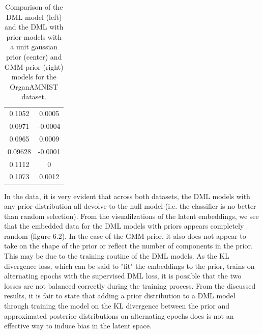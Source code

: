 \documentclass[./dissertation.tex]{subfiles}
\begin{document}
\begin{table}[]
\begin{tabular}{|c|c|}
            0.1052 & 0.0005 \\
            0.0971 & -0.0004 \\
            0.0965 & 0.0009 \\
            0.09628 & -0.0001 \\
            0.1112 & 0 \\
            0.1073 & 0.0012 \\
            \hline
       \end{tabular}
       \caption{Comparison of the DML model (left) and the DML with prior models with a unit gaussian prior (center) and GMM prior (right) models for the OrganAMNIST dataset.\\}
       \label{tab:my_label}
   \end{table}
   
   In the data, it is very evident that across both datasets, the DML models with any prior distribution all devolve to the null model (i.e. the classifier is no better than random selection). From the visualilzations of the latent embeddings, we see that the embedded data for the DML models with priors appears completely random (figure 6.2). In the case of the GMM prior, it also does not appear to take on the shape of the prior or reflect the number of components in the prior. This may be due to the training routine of the DML models. As the KL divergence loss, which can be said to "fit" the embeddings to the prior, trains on alternating epochs with the supervised DML loss, it is possible that the two losses are not balanced correctly during the training process. From the discussed results, it is fair to state that adding a prior distribution to a DML model through training the model on the KL divergence between the prior and approximated posterior distributions on alternating epochs does is not an effective way to induce bias in the latent space.
   
\end{document}
